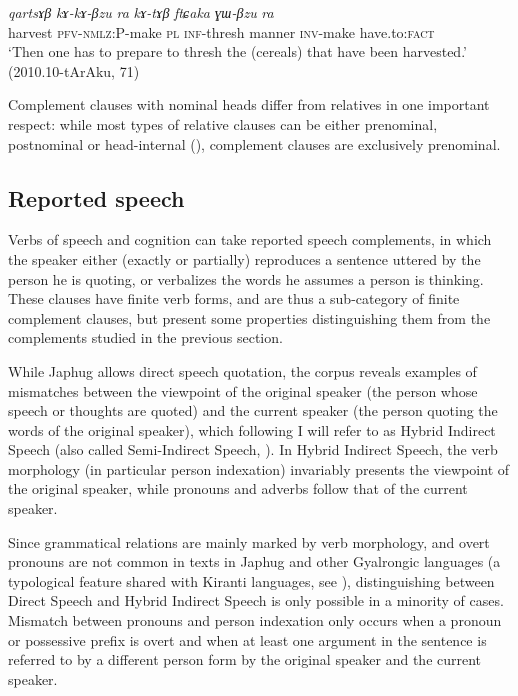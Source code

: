 \documentclass[oneside,a4paper,11pt]{article}
\newcommand{\ipa}[1]{\textit{\phon#1}}
\begin{document}
 \begin{exe}
\ex \label{ex:kAtAB}
\gll
 \ipa{qartsɤβ} 	\ipa{kɤ-kɤ-βzu} 	\ipa{ra} 	\ipa{kɤ-tɤβ} 	\ipa{ftɕaka} 	\ipa{ɣɯ-βzu} 	\ipa{ra} \\
 harvest \textsc{pfv-nmlz:P}-make \textsc{pl} \textsc{inf}-thresh manner \textsc{inv}-make have.to:\textsc{fact} \\
 \glt `Then one has to prepare to thresh the (cereals) that have been harvested.' (2010.10-tArAku, 71)
\end{exe}

Complement clauses with nominal heads differ from relatives in one important respect: while most types of relative clauses can be either prenominal, postnominal or head-internal (\citealt{jacques16relatives}), complement clauses are exclusively prenominal.

\subsection{Reported speech} \label{sec:reported}
Verbs of speech and cognition can take reported speech complements, in which the speaker either (exactly or partially) reproduces a sentence uttered by the person he is quoting, or verbalizes the words he assumes a person is thinking. These clauses have finite verb forms, and are thus a sub-category of finite complement clauses, but present some properties distinguishing them from the complements studied in the previous section.

While Japhug allows direct speech quotation, the corpus reveals examples of mismatches between the viewpoint of the original speaker (the person whose speech or thoughts are quoted) and the current speaker (the person quoting the words of the original speaker), which following \citet{tournadre08conjunct} I will refer to as Hybrid Indirect Speech (also called Semi-Indirect Speech, \citet{aikhenvald08semidirect}). In Hybrid Indirect Speech, the verb morphology (in particular person indexation) invariably presents the viewpoint of the original speaker, while pronouns and adverbs follow that of the current speaker.

Since grammatical relations are mainly marked by verb morphology, and overt pronouns 
are not common in texts in Japhug and other Gyalrongic languages (a typological feature shared with Kiranti languages, see \citealt{bickel01deictic}), distinguishing between Direct Speech and Hybrid Indirect Speech is only possible in a minority of cases. Mismatch between pronouns and person indexation only occurs when a pronoun or possessive prefix is overt and when at least one argument in the sentence is referred to by a different person form by the original speaker and the current speaker. 
\end{document}
